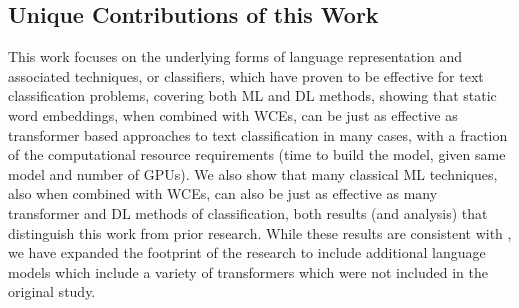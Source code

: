 \documentclass[final]{clv2025}
\begin{document}
\subsection{Unique Contributions of this Work}

This work focuses on the underlying forms of language representation and associated techniques, or classifiers, which have proven to be effective for text classification problems, covering both ML and DL methods, showing that static word embeddings, when combined with WCEs, can be just as effective as transformer based approaches to text classification in many cases, with a fraction of the computational resource requirements (time to build the model, given same model and number of GPUs). We also show that many classical ML techniques, also when combined with WCEs, can also be just as effective as many transformer and DL methods of classification, both results (and analysis) that distinguish this work from prior research. While these results are consistent with \cite{moreo}, we have expanded the footprint of the research to include additional language models which include a variety of transformers which were not included in the original study.
\end{document}

